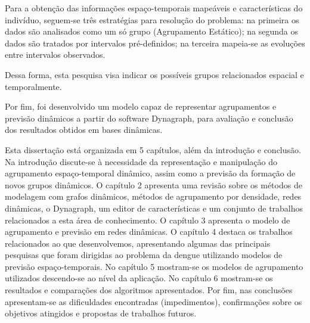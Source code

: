 Para a obtenção das informações espaço-temporais mapeáveis e características do indivíduo, seguem-se três estratégias para resolução do problema: na primeira os dados são analisados como um só grupo (Agrupamento Estático); na segunda os dados são tratados por intervalos pré-definidos; na terceira mapeia-se as evoluções entre intervalos observados.

Dessa forma, esta pesquisa visa indicar os possíveis grupos relacionados espacial e temporalmente.

Por fim, foi desenvolvido um modelo capaz de representar agrupamentos e previsão dinâmicos a partir do software Dynagraph, para avaliação e conclusão dos resultados obtidos em bases dinâmicas.


Esta dissertação está organizada em 5 capítulos, além da introdução e conclusão. Na
introdução discute-se à necessidade da representação e manipulação do agrupamento espaço-temporal dinâmico, assim como a previsão da formação de novos grupos dinâmicos. O capítulo 2 apresenta uma revisão sobre os métodos de modelagem com grafos dinâmicos, métodos de agrupamento por densidade, redes dinâmicas, o Dynagraph, um editor de características e um conjunto de trabalhos relacionados a esta área de conhecimento. O capítulo 3 apresenta o modelo de agrupamento e previsão em redes dinâmicas. O capítulo 4 destaca os trabalhos relacionados ao que desenvolvemos, apresentando algumas das principais pesquisas que foram dirigidas ao problema da dengue utilizando modelos de previsão espaço-temporais. No capítulo 5 mostram-se os modelos de agrupamento utilizados descendo-se ao nível da aplicação. No capítulo 6 mostram-se os resultados e comparações dos algoritmos apresentados. Por fim, nas conclusões apresentam-se as dificuldades encontradas (impedimentos), confirmações sobre os objetivos atingidos e propostas de trabalhos futuros.








